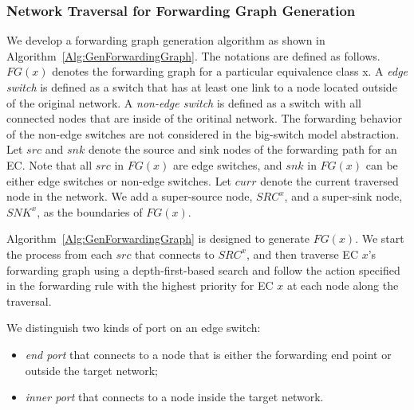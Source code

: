 \subsubsection{Network Traversal for Forwarding Graph Generation}

We develop a forwarding graph generation algorithm as shown in Algorithm~\ref{Alg:GenForwardingGraph}.
The notations are defined as follows.
$FG(x)$ denotes the forwarding graph for a particular equivalence class x.
A \textit{edge switch} is defined as a switch that has at least one link to a node located outside of the original network. 
A \textit{non-edge switch} is defined as a switch with all connected nodes that are inside of the oritinal network.
The forwarding behavior of the non-edge switches are not considered in the big-switch model abstraction.
Let $src$ and $snk$ denote the source and sink nodes of the forwarding path for an EC.
Note that all $src$ in $FG(x)$ are edge switches,
and $snk$ in $FG(x)$ can be either edge switches or non-edge switches.
Let $curr$ denote the current traversed node in the network.
We add a super-source node, $SRC^x$, and a super-sink node, $SNK^x$, as the boundaries of $FG(x)$.

Algorithm~\ref{Alg:GenForwardingGraph} is designed to generate $FG(x)$.
We start the process from each $src$ that connects to $SRC^x$,
and then traverse EC $x$'s forwarding graph using a depth-first-based search and
follow the action specified in the forwarding rule with the highest priority for EC $x$ at each node along the traversal.


We distinguish two kinds of port on an edge switch:
\begin{itemize}
\item \textit{end port} that connects to a node that is either the forwarding end point or outside the target network;
\item \textit{inner port} that connects to a node inside the target network.
\end{itemize}

